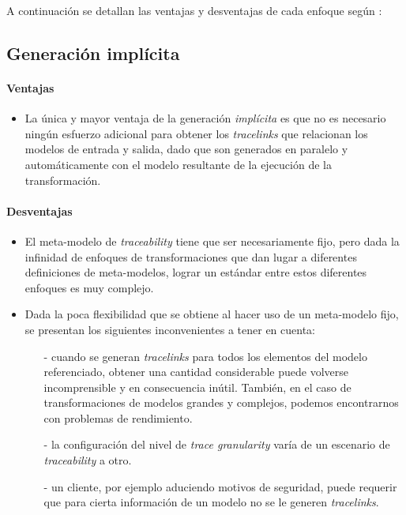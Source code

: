 \documentclass[a4paper,12pt,oneside,spanish]{book}
\begin{document}
A continuación se detallan las ventajas y desventajas de cada enfoque según \cite{GrammelVoigt}:


\subsection{Generación implícita}

\paragraph{Ventajas}

\begin{itemize}[label={\checkmark}]

\item La única y mayor ventaja de la generación \textit{implícita} es que no es necesario ningún esfuerzo adicional para obtener los \textit{tracelinks} que relacionan los modelos de entrada y salida, dado que son generados en paralelo y automáticamente con el modelo resultante de la ejecución de la transformación.

\end{itemize}

\paragraph{Desventajas}

\begin{itemize}[label={$\times$}]

\item El meta-modelo de \textit{traceability} tiene que ser necesariamente fijo, pero dada la infinidad de enfoques de transformaciones que dan lugar a diferentes definiciones de meta-modelos, lograr un estándar entre estos diferentes enfoques es muy complejo.

\item Dada la poca flexibilidad que se obtiene al hacer uso de un meta-modelo fijo, se presentan los siguientes inconvenientes a tener en cuenta:

\begin{itemize}

\item[-] cuando se generan \textit{tracelinks} para todos los elementos del modelo referenciado, obtener una cantidad considerable puede volverse incomprensible y en consecuencia inútil. También, en el caso de transformaciones de modelos grandes y complejos, podemos encontrarnos con problemas de rendimiento.

\item[-] la configuración del nivel de \textit{trace granularity} varía de un escenario de \textit{traceability} a otro.

\item[-] un cliente, por ejemplo aduciendo motivos de seguridad, puede requerir que para cierta información de un modelo no se le generen \textit{tracelinks}.

\end{itemize}

\end{itemize}
\end{document}
